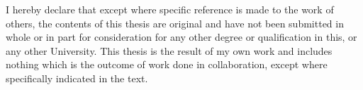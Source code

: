
\begin{declaration}

I hereby declare that except where specific reference is made to the work of others, the contents of this thesis are original and have not been submitted in whole or in part for consideration for any other degree or qualification in this, or any other University. This thesis is the result of my own work and includes nothing which is the outcome of work done in collaboration, except where specifically indicated in the text. 


\end{declaration}

